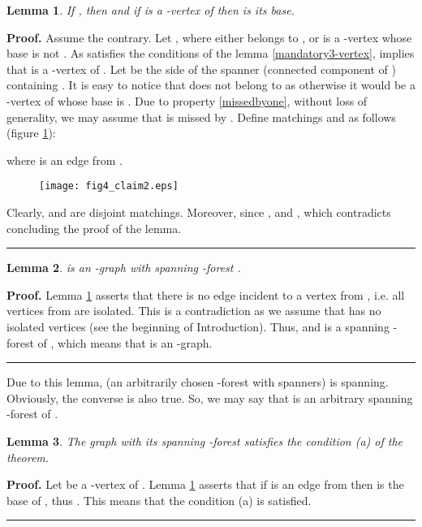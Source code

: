 \documentclass[a4paper, 12pt]{article}
\newtheorem{lemma}{Lemma}[subsection]
\newenvironment{proof}[1][Proof]{\noindent\textbf{#1.} }{\ \rule{0.5em}{0.5em}}
\begin{document}
\begin{lemma}\label{cannotbe3-vertex}
If , then  and if  is
a -vertex of  then  is its base.
\end{lemma}
\begin{proof}
Assume the contrary. Let , where 
either belongs to , or is a -vertex whose
base is not . As  satisfies the conditions of the lemma
\ref{mandatory3-vertex}, implies that  is a -vertex of .
Let  be the side of the spanner  (connected component of
) containing . It is easy to notice that  does not belong
to  as otherwise it would be a -vertex of  whose
base is . Due to property \ref{missedbyone}, without loss of
generality, we may assume that  is missed by . Define
matchings  and  as follows (figure
\ref{fig_claim_cannotbe3-vertex}):


where  is an edge from .

\begin{figure}[h]
\begin{center}
\texttt{[image: fig4\_claim2.eps]}\\
\caption{}\label{fig_claim_cannotbe3-vertex}
\end{center}
\end{figure}

Clearly,  and  are disjoint matchings. Moreover, since
,  and , which
contradicts  concluding the proof of the lemma.
\end{proof}

\begin{lemma} \label{S-graph}
 is an -graph with spanning -forest .
\end{lemma}
\begin{proof}
Lemma \ref{cannotbe3-vertex} asserts that there is no edge incident
to a vertex from , i.e. all vertices from
 are isolated. This is a contradiction as we
assume that  has no isolated vertices (see the beginning of
Introduction). Thus,  and  is a
spanning -forest of , which means that  is an -graph.
\end{proof}

Due to this lemma,  (an arbitrarily chosen -forest with
 spanners) is spanning. Obviously, the
converse is also true. So, we may say that  is an arbitrary
spanning -forest of .

\begin{lemma} \label{condition1}
The graph  with its spanning -forest  satisfies the
condition (a) of the theorem.
\end{lemma}
\begin{proof}
Let  be a -vertex of . Lemma \ref{cannotbe3-vertex} asserts
that if  is an edge from  then 
is the base of , thus . This means that the
condition (a) is satisfied.
\end{proof}
\end{document}
